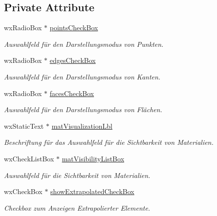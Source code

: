 \subsection*{Private Attribute}
\begin{DoxyCompactItemize}
\item 
wx\-Radio\-Box $\ast$ \hyperlink{classViewpropBox_a706dfcdceaa1afff899f51eb2ebded81}{points\-Check\-Box}
\begin{DoxyCompactList}\small\item\em Auswahlfeld für den Darstellungsmodus von Punkten. \end{DoxyCompactList}\item 
wx\-Radio\-Box $\ast$ \hyperlink{classViewpropBox_a42925abd6e515ec8f12e9de662edf39e}{edges\-Check\-Box}
\begin{DoxyCompactList}\small\item\em Auswahlfeld für den Darstellungsmodus von Kanten. \end{DoxyCompactList}\item 
wx\-Radio\-Box $\ast$ \hyperlink{classViewpropBox_ad5b2d4c590f1594ae5b0c80251d80005}{faces\-Check\-Box}
\begin{DoxyCompactList}\small\item\em Auswahlfeld für den Darstellungsmodus von Flächen. \end{DoxyCompactList}\item 
wx\-Static\-Text $\ast$ \hyperlink{classViewpropBox_a6352cdc6579ed2b9a7cfdd28a847bfec}{mat\-Visualization\-Lbl}
\begin{DoxyCompactList}\small\item\em Beschriftung für das Auswahlfeld für die Sichtbarkeit von Materialien. \end{DoxyCompactList}\item 
wx\-Check\-List\-Box $\ast$ \hyperlink{classViewpropBox_a8e6d0646ebdd844f96acde46e63fb74d}{mat\-Visibility\-List\-Box}
\begin{DoxyCompactList}\small\item\em Auswahlfeld für die Sichtbarkeit von Materialien. \end{DoxyCompactList}\item 
wx\-Check\-Box $\ast$ \hyperlink{classViewpropBox_a26459f6ab8498b578ecf30dcb4fd582e}{show\-Extrapolated\-Check\-Box}
\begin{DoxyCompactList}\small\item\em Checkbox zum Anzeigen Extrapolierter Elemente. \end{DoxyCompactList}\item 

\end{DoxyCompactItemize}
